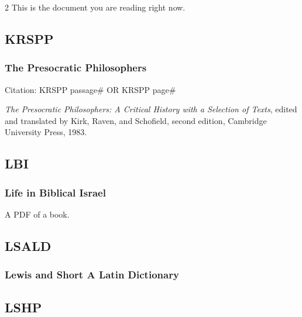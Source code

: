 \begin{multicols}{2}
			This is the document you are reading right now.
		
	\subsection*{KRSPP}
	
		\subsubsection*{The Presocratic Philosophers}
		
			Citation:
				KRSPP passage\# OR
				KRSPP page\#
				
			\textit{The Presocratic Philosophers: A Critical History with a Selection of Texts}, edited and translated by Kirk, Raven, and Schofield, second edition, Cambridge University Press, 1983.
			
	\subsection*{LBI}
	
		\subsubsection*{Life in Biblical Israel}
		
			A PDF of a book.
			
	\subsection*{LSALD}
	
		\subsubsection*{Lewis and Short A Latin Dictionary}
		
			\phantom{.}
		
	\subsection*{LSHP}
	

\end{multicols}
